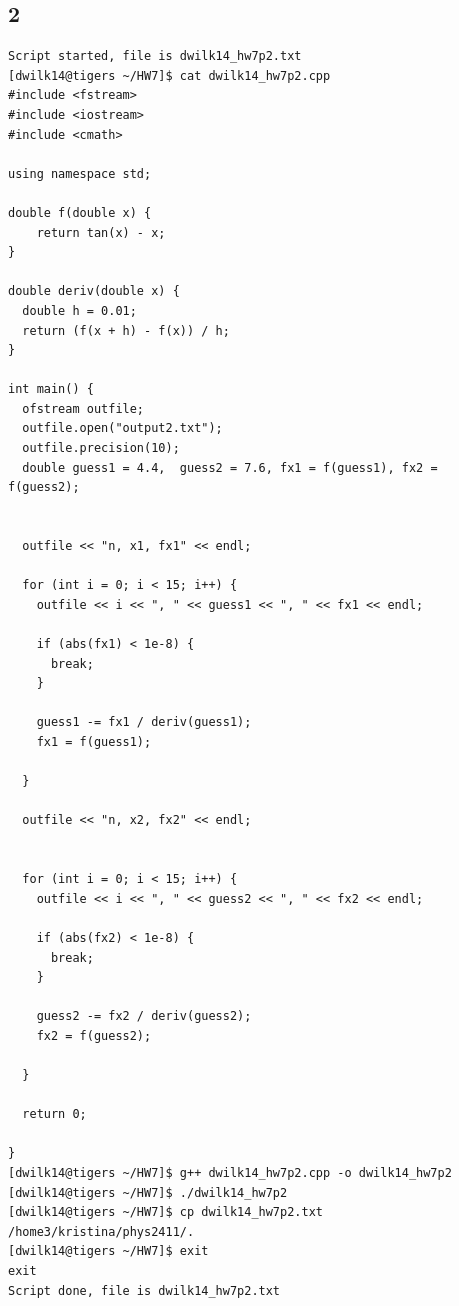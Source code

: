 \documentclass{article}
\begin{document}
\subsection*{2}
\begin{verbatim}
Script started, file is dwilk14_hw7p2.txt
[dwilk14@tigers ~/HW7]$ cat dwilk14_hw7p2.cpp
#include <fstream>
#include <iostream>
#include <cmath>

using namespace std;

double f(double x) {
    return tan(x) - x;
}

double deriv(double x) {
  double h = 0.01;
  return (f(x + h) - f(x)) / h;
}

int main() {
  ofstream outfile;
  outfile.open("output2.txt");
  outfile.precision(10);
  double guess1 = 4.4,  guess2 = 7.6, fx1 = f(guess1), fx2 = f(guess2);


  outfile << "n, x1, fx1" << endl;

  for (int i = 0; i < 15; i++) {
    outfile << i << ", " << guess1 << ", " << fx1 << endl;

    if (abs(fx1) < 1e-8) {
      break;
    }

    guess1 -= fx1 / deriv(guess1);
    fx1 = f(guess1);

  }

  outfile << "n, x2, fx2" << endl;


  for (int i = 0; i < 15; i++) {
    outfile << i << ", " << guess2 << ", " << fx2 << endl;

    if (abs(fx2) < 1e-8) {
      break;
    }

    guess2 -= fx2 / deriv(guess2);
    fx2 = f(guess2);

  }

  return 0;

}
[dwilk14@tigers ~/HW7]$ g++ dwilk14_hw7p2.cpp -o dwilk14_hw7p2
[dwilk14@tigers ~/HW7]$ ./dwilk14_hw7p2
[dwilk14@tigers ~/HW7]$ cp dwilk14_hw7p2.txt /home3/kristina/phys2411/.
[dwilk14@tigers ~/HW7]$ exit
exit
Script done, file is dwilk14_hw7p2.txt
\end{verbatim}
\end{document}
